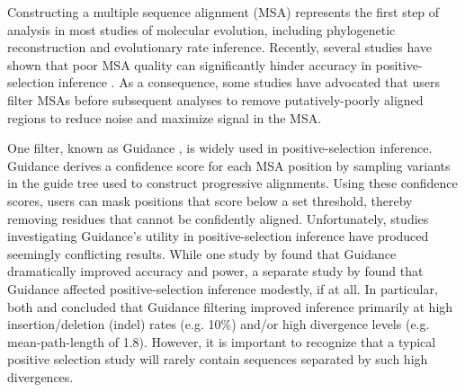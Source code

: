 \documentclass[11pt]{article}
\begin{document}
Constructing a multiple sequence alignment (MSA) represents the first step of analysis in most studies of molecular evolution, including phylogenetic reconstruction and evolutionary rate inference. Recently, several studies have shown that poor MSA quality can significantly hinder accuracy in positive-selection inference  \citep{Schneider2009, Fletcher2010, MarkovaRaina2011}. As a consequence, some studies have advocated that users filter MSAs before subsequent analyses to remove putatively-poorly aligned regions \citep{Jordan2012,Privman2012} to reduce noise and maximize signal in the MSA.

One filter, known as Guidance \citep{Penn2010}, is widely used in positive-selection inference. Guidance derives a confidence score for each MSA position by sampling variants in the guide tree used to construct progressive alignments. Using these confidence scores, users can mask positions that score below a set threshold, thereby removing residues that cannot be confidently aligned. Unfortunately, studies investigating Guidance's utility in positive-selection inference have produced seemingly conflicting results. While one study by \citet{Privman2012} found that Guidance dramatically improved accuracy and power, a separate study by \citet{Jordan2012} found that Guidance affected positive-selection inference modestly, if at all. In particular, both \citet{Privman2012} and \citet{Jordan2012} concluded that Guidance filtering improved inference primarily at high insertion/deletion (indel) rates (e.g. 10\%) and/or high divergence levels (e.g. mean-path-length of 1.8). However, it is important to recognize that a typical positive selection study will rarely contain sequences separated by such high divergences. 
\end{document}
